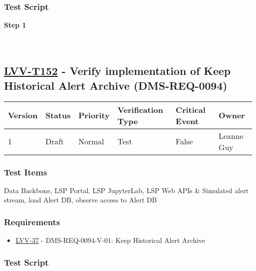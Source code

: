 \hypertarget{test-script-51}{%
\subsubsection{Test Script}\label{test-script-51}}

\textbf{Step 1}\\
~\\
~\\

\hypertarget{lvv-t152---verify-implementation-of-keep-historical-alert-archive-dms-req-0094}{%
\subsection{\texorpdfstring{\href{https://jira.lsstcorp.org/secure/Tests.jspa\#/testCase/LVV-T152}{LVV-T152}
- Verify implementation of Keep Historical Alert Archive
(DMS-REQ-0094)}{LVV-T152 - Verify implementation of Keep Historical Alert Archive (DMS-REQ-0094)}}\label{lvv-t152---verify-implementation-of-keep-historical-alert-archive-dms-req-0094}}

\begin{longtable}[]{@{}llllll@{}}
\toprule
Version & Status & Priority & Verification Type & Critical Event &
Owner\tabularnewline
\midrule
\endhead
1 & Draft & Normal & Test & False & Leanne Guy\tabularnewline
\bottomrule
\end{longtable}

\hypertarget{test-items-52}{%
\subsubsection{Test Items}\label{test-items-52}}

Data Backbone, LSP Portal, LSP JupyterLab, LSP Web APIs \& Simulated
alert stream, load Alert DB, observe access to Alert DB

\hypertarget{requirements-52}{%
\subsubsection{Requirements}\label{requirements-52}}

\begin{itemize}
\tightlist
\item
  \href{https://jira.lsstcorp.org/browse/LVV-37}{LVV-37} -
  DMS-REQ-0094-V-01: Keep Historical Alert Archive
\end{itemize}

\hypertarget{test-script-52}{%
\subsubsection{Test Script}\label{test-script-52}}

